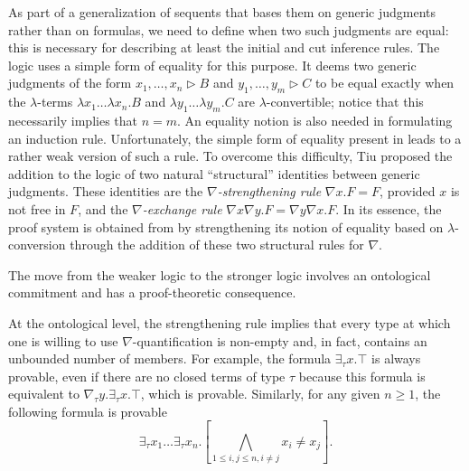 As part of a generalization of sequents that bases them on generic
judgments rather than on formulas, we need to
define when two such judgments are equal: this is necessary
for describing at least the initial and cut inference rules.  The
\foldnb logic \cite{miller05tocl} uses a simple form of equality for
this purpose. It deems two generic judgments of the form
$x_1,\ldots,x_n\triangleright B$ and $y_1,\ldots,y_m\triangleright C$
to be equal exactly when the $\lambda$-terms $\lambda
x_1\ldots\lambda x_n. B$ and $\lambda y_1\ldots\lambda y_m. C$ are
$\lambda$-convertible; notice that this necessarily implies that
$n=m$. An equality notion is also needed in formulating an induction
rule. Unfortunately, the simple form of equality present in \foldnb
leads to a rather weak version of such a rule. To overcome this difficulty,
Tiu proposed the addition to the logic of two natural ``structural''
identities between generic judgments.
These identities are the $\nabla${\em -strengthening rule}
$\nabla x. F = F$, provided $x$ is not free in $F$, and the
$\nabla${\em -exchange rule} $\nabla x\nabla y. F = \nabla y\nabla
x. F$.  In its essence, the \LG proof system \cite{tiu06lfmtp} is
obtained from \foldnb by strengthening its notion of equality based on
$\lambda$-conversion through the addition of these two structural
rules for $\nabla$.


The move from the weaker
logic \foldnb to the stronger logic \LG involves an ontological
commitment and has a proof-theoretic consequence.

At the ontological level, the strengthening rule implies that every
type at which one is
willing to use $\nabla$-quantification is non-empty and, in fact,
contains an unbounded number of members.  For example, the formula
$\exists_\tau x.\top$ is always provable, even if there are no closed
terms of type $\tau$ because this formula is equivalent to
$\nabla_\tau y.\exists_\tau x.\top$, which is provable.
Similarly, for any given $n\geq 1$, the following formula
is provable
\[
\exists_\tau x_1\ldots\exists_\tau x_n.
 \left[\bigwedge_{1\leq i,j\leq n, i\not= j} x_i \not= x_j\right].
\]

